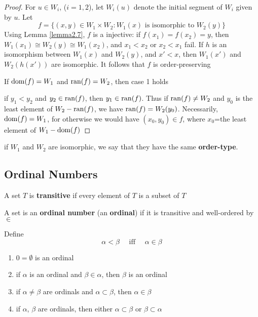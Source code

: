 \documentclass[11pt]{article}
\begin{document}
\begin{proof}
For \(u\in W_i\), (\(i=1,2\)), let \(W_i(u)\) denote the initial segment of \(W_i\) given by \(u\).
Let
\begin{equation*}
f=\{(x,y)\in W_1\times W_2:W_1(x)\text{ is isomorphic to }W_2(y)\}
\end{equation*}
Using Lemma \ref{lemma2.7}, \(f\) is a injective: if \(f(x_1)=f(x_2)=y\),
then \(W_1(x_1)\cong W_2(y)\cong W_1(x_2)\), and \(x_1<x_2\) or \(x_2<x_1\) fail. If \(h\) is an isomorphism
between \(W_1(x)\) and \(W_2(y)\), and \(x'<x\), then \(W_1(x')\) and \(W_2(h(x'))\) are isomorphic.
It follows that \(f\) is order-preserving

If \(\operatorname{dom}(f)=W_1\) and \(\operatorname{ran}(f)=W_2\), then case 1 holds

if \(y_1<y_2\) and \(y_2\in\operatorname{ran}(f)\), then \(y_1\in\operatorname{ran}(f)\). Thus if \(\operatorname{ran}(f)\neq W_2\) and \(y_0\) is the
least element of \(W_2-\operatorname{ran}(f)\), we have \(\operatorname{ran}(f)=W_2(y_0)\). Necessarily, \(\operatorname{dom}(f)=W_1\), for
otherwise we would have \((x_0,y_0)\in f\), where \(x_0\)=the least element of \(W_1-\operatorname{dom}(f)\)
\end{proof}

if \(W_1\) and \(W_2\) are isomorphic, we say that they have the same \textbf{order-type}.

\subsection{Ordinal Numbers}
\label{sec:orgaeea01f}
\begin{definition}[]
A set \(T\) is \textbf{transitive} if every element of \(T\) is a subset of \(T\)
\end{definition}

\begin{definition}[]
A set is an \textbf{ordinal number} (an \textbf{ordinal}) if it is transitive and well-ordered by \(\in\)
\end{definition}

Define
\begin{equation*}
\alpha<\beta \quad\text{ iff }\quad \alpha\in\beta
\end{equation*}

\begin{lemma}[]
\label{lemma2.11}
\begin{enumerate}
\item \(0=\emptyset\) is an ordinal
\item if \(\alpha\) is an ordinal and \(\beta\in\alpha\), then \(\beta\) is an ordinal
\item if \(\alpha\neq\beta\) are ordinals and \(\alpha\subset\beta\), then \(\alpha\in\beta\)
\item if \(\alpha\), \(\beta\) are ordinals, then either \(\alpha\subset\beta\) or \(\beta\subset\alpha\)
\end{enumerate}
\end{lemma}
\end{document}

